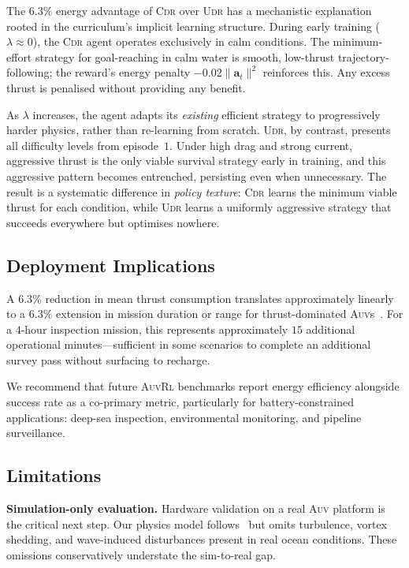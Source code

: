 \documentclass[letterpaper,10pt,journal]{IEEEtran}
\newcommand{\CDR}{\textsc{Cdr}\xspace}
\newcommand{\UDR}{\textsc{Udr}\xspace}
\newcommand{\AUV}{\textsc{Auv}\xspace}
\newcommand{\RL}{\textsc{Rl}\xspace}
\begin{document}
The $6.3\%$ energy advantage of \CDR over \UDR has a mechanistic
explanation rooted in the curriculum's implicit learning structure.
During early training ($\lambda\approx0$), the \CDR agent operates
exclusively in calm conditions.
The minimum-effort strategy for goal-reaching in calm water is smooth,
low-thrust trajectory-following; the reward's energy penalty $-0.02\|\mathbf{a}_t\|^2$
reinforces this.
Any excess thrust is penalised without providing any benefit.

As $\lambda$ increases, the agent adapts its \emph{existing} efficient
strategy to progressively harder physics, rather than re-learning from scratch.
\UDR, by contrast, presents all difficulty levels from episode~$1$.
Under high drag and strong current, aggressive thrust is the only viable
survival strategy early in training, and this aggressive pattern becomes
entrenched, persisting even when unnecessary.
The result is a systematic difference in \emph{policy texture}: \CDR
learns the minimum viable thrust for each condition, while \UDR learns
a uniformly aggressive strategy that succeeds everywhere but
optimises nowhere.

\subsection{Deployment Implications}

A $6.3\%$ reduction in mean thrust consumption translates approximately
linearly to a $6.3\%$ extension in mission duration or range for
thrust-dominated \AUV{}s~\cite{fossen2011}.
For a $4$-hour inspection mission, this represents approximately
$15$ additional operational minutes---sufficient in some scenarios
to complete an additional survey pass without surfacing to recharge.

We recommend that future \AUV \RL benchmarks report energy efficiency
alongside success rate as a co-primary metric, particularly for
battery-constrained applications: deep-sea inspection, environmental
monitoring, and pipeline surveillance.

\subsection{Limitations}

\textbf{Simulation-only evaluation.}
Hardware validation on a real \AUV platform is the critical next step.
Our physics model follows~\citet{fossen2011} but omits turbulence,
vortex shedding, and wave-induced disturbances present in real ocean
conditions.
These omissions conservatively understate the sim-to-real gap.
\end{document}
